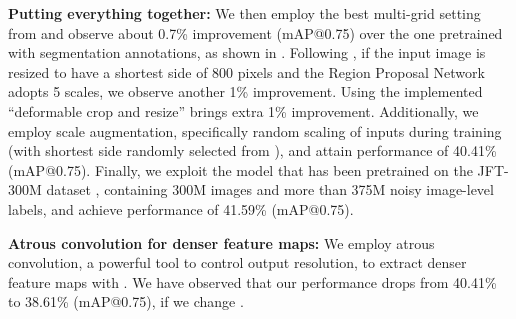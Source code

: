 \textbf{Putting everything together:} We then employ the best multi-grid setting from  and observe about 0.7\% improvement (mAP@0.75) over the one pretrained with segmentation annotations, as shown in . Following \cite{lin2016feature, he2017mask}, if the input image is resized to have a shortest side of 800 pixels and the Region Proposal Network adopts 5 scales, we observe another 1\% improvement. Using the implemented ``deformable crop and resize'' brings extra 1\% improvement. Additionally, we employ scale augmentation, specifically random scaling of inputs during training (with shortest side randomly selected from ), and attain performance of 40.41\% (mAP@0.75). Finally, we exploit the model that has been pretrained on the JFT-300M dataset \cite{hinton2015distilling, chollet2016xception, sun2017revisiting}, containing 300M images and more than 375M noisy image-level labels, and achieve performance of 41.59\% (mAP@0.75). 

\textbf{Atrous convolution for denser feature maps:} We employ atrous convolution, a powerful tool to control output resolution, to extract denser feature maps with . We have observed that our performance drops from 40.41\% to 38.61\% (mAP@0.75), if we change .

